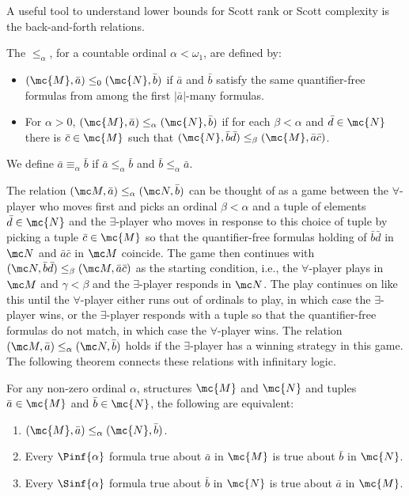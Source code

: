 \documentclass[10pt,a4paper]{amsart}
\renewcommand{\-}{\text{-}}
\begin{document}
A useful tool to understand lower bounds for Scott rank or Scott complexity is the back-and-forth relations.
\begin{definition}
The  $\leq_\alpha$, for a countable ordinal $\alpha < \omega_1$, are defined by:
    \begin{itemize}
        \item $(\mc{M},\bar{a}) \leq_0 (\mc{N},\bar{b})$ if $\bar{a}$ and $\bar{b}$ satisfy the same quantifier-free formulas from among the first $|\bar{a}|$-many formulas.
        \item For $\alpha > 0$, $(\mc{M},\bar{a}) \leq_\alpha (\mc{N},\bar{b})$ if for each $\beta < \alpha$ and $\bar{d} \in \mc{N}$ there is $\bar{c} \in \mc{M}$ such that $(\mc{N},\bar{b} \bar{d}) \leq_\beta (\mc{M},\bar{a} \bar{c})$.
    \end{itemize}
We define $\bar{a} \equiv_\alpha \bar{b}$ if $\bar{a} \leq_\alpha \bar{b}$ and $\bar{b} \leq_\alpha \bar{a}$.
\end{definition}

The relation $(\mc M,\bar a)\leq_\alpha (\mc N,\bar b)$ can be thought of as a game between the $\forall$-player who moves first and picks an ordinal  $\beta<\alpha$ and a tuple of elements $\bar d\in\mc{N}$ and the $\exists$-player who moves in response to this choice of tuple by picking a tuple $\bar c\in \mc{M}$ so that the quantifier-free formulas holding of $\bar b\bar d$ in $\mc N$ and $\bar a \bar c$ in $\mc M$ coincide. The game then continues with $(\mc N,\bar b\bar d)\leq_\beta (\mc M,\bar a\bar c)$ as the starting condition, i.e., the $\forall$-player plays in $\mc M$ and $\gamma<\beta$ and the $\exists$-player responds in $\mc N$. The play continues on like this until the $\forall$-player either runs out of ordinals to play, in which case the $\exists$-player wins, or the $\exists$-player responds with a tuple so that the quantifier-free formulas do not match, in which case the $\forall$-player wins.
The relation $(\mc M,\bar a)\leq_\alpha(\mc N,\bar b)$ holds if the $\exists$-player has a winning strategy in this game.
The following theorem connects these relations with infinitary logic.

\begin{theorem}
For any non-zero ordinal $\alpha$, structures $\mc{M}$ and $\mc{N}$ and tuples $\bar{a}\in\mc{M}$ and $\bar{b}\in\mc{N}$, the following are equivalent:
    \begin{enumerate}
	\item $(\mc{M},\bar{a})\leq_\alpha (\mc{N},\bar{b})$.
	\item Every $\Pinf{\alpha}$ formula true about $\bar{a}$ in $\mc{M}$ is true about $\bar{b}$ in $\mc{N}$.
	\item Every $\Sinf{\alpha}$ formula true about $\bar{b}$ in $\mc{N}$ is true about $\bar{a}$ in $\mc{M}$.
    \end{enumerate} 
\end{theorem}
\end{document}

